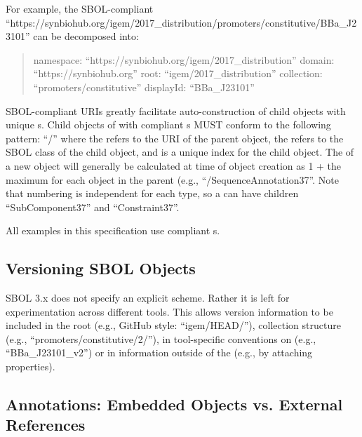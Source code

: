 For example, the SBOL-compliant   ``https://synbiohub.org/igem/2017\_distribution/promoters/constitutive/BBa\_J23101'' can be decomposed into: 
\begin{quote} 
namespace: ``https://synbiohub.org/igem/2017\_distribution'' \linebreak
domain: ``https://synbiohub.org'' \linebreak
root: ``igem/2017\_distribution'' \linebreak
collection: ``promoters/constitutive'' \linebreak
displayId: ``BBa\_J23101'' \linebreak
\end{quote}

SBOL-compliant URIs greatly facilitate auto-construction of child objects with unique s. Child objects of  with compliant s MUST conform to the following pattern: ``/'' where the  refers to the URI of the parent object, the  refers to the SBOL class of the child object, and  is a unique index for the child object. The  of a new object will generally be calculated at time of object creation as 1 + the maximum  for each  object in the parent (e.g., ``/SequenceAnnotation37''. Note that numbering is independent for each type, so a  can have children ``SubComponent37'' and ``Constraint37''.

All examples in this specification use compliant s.

\subsection{Versioning SBOL Objects}
SBOL 3.x does not specify an explicit scheme. Rather it is left for experimentation across different tools. This allows version information to be included in the root (e.g., GitHub style: ``igem/HEAD/''), collection structure (e.g., ``promoters/constitutive/2/''), in tool-specific conventions on  (e.g., ``BBa\_J23101\_v2'') or in information outside of the  (e.g., by attaching  properties).

\subsection{Annotations: Embedded Objects vs. External References}

